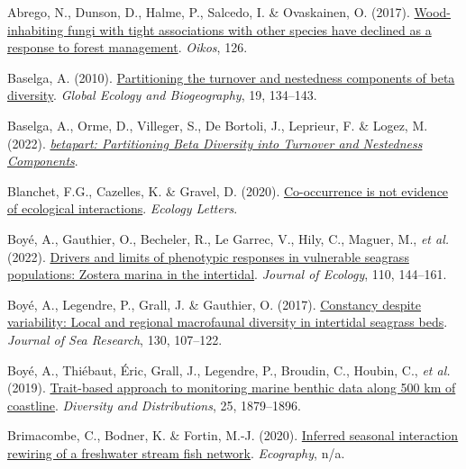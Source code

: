 \documentclass[9pt,biorxiv,doublespacing,lineno]{lapreprint}
\newlength{\cslhangindent}
\newlength{\cslentryspacingunit} %
\newenvironment{CSLReferences}[2] %
 {%
  \setlength{\parindent}{0pt}
  \ifodd #1
  \let\oldpar\par
  \def\par{\hangindent=\cslhangindent\oldpar}
  \fi
  \setlength{\parskip}{#2\cslentryspacingunit}
 }%
 {}
\begin{document}
\hypertarget{refs}{}
\begin{CSLReferences}{1}{0}
\leavevmode{}%
Abrego, N., Dunson, D., Halme, P., Salcedo, I. \& Ovaskainen, O. (2017).
\href{https://doi.org/10.1111/oik.03674}{Wood-inhabiting fungi with
tight associations with other species have declined as a response to
forest management}. \emph{Oikos}, 126.

\leavevmode{}%
Baselga, A. (2010).
\href{https://doi.org/10.1111/j.1466-8238.2009.00490.x}{Partitioning the
turnover and nestedness components of beta diversity}. \emph{Global
Ecology and Biogeography}, 19, 134--143.

\leavevmode{}%
Baselga, A., Orme, D., Villeger, S., De Bortoli, J., Leprieur, F. \&
Logez, M. (2022).
\emph{\href{https://CRAN.R-project.org/package=betapart}{betapart:
Partitioning Beta Diversity into Turnover and Nestedness Components}}.

\leavevmode{}%
Blanchet, F.G., Cazelles, K. \& Gravel, D. (2020).
\href{https://doi.org/10.1111/ele.13525}{Co-occurrence is not evidence
of ecological interactions}. \emph{Ecology Letters}.

\leavevmode{}%
Boyé, A., Gauthier, O., Becheler, R., Le Garrec, V., Hily, C., Maguer,
M., \emph{et al.} (2022).
\href{https://doi.org/10.1111/1365-2745.13791}{Drivers and limits of
phenotypic responses in vulnerable seagrass populations: Zostera marina
in the intertidal}. \emph{Journal of Ecology}, 110, 144--161.

\leavevmode{}%
Boyé, A., Legendre, P., Grall, J. \& Gauthier, O. (2017).
\href{https://doi.org/10.1016/j.seares.2017.06.004}{Constancy despite
variability: Local and regional macrofaunal diversity in intertidal
seagrass beds}. \emph{Journal of Sea Research}, 130, 107--122.

\leavevmode{}%
Boyé, A., Thiébaut, Éric, Grall, J., Legendre, P., Broudin, C., Houbin,
C., \emph{et al.} (2019).
\href{https://doi.org/10.1111/ddi.12987}{Trait-based approach to
monitoring marine benthic data along 500 km of coastline}.
\emph{Diversity and Distributions}, 25, 1879--1896.

\leavevmode{}%
Brimacombe, C., Bodner, K. \& Fortin, M.-J. (2020).
\href{https://doi.org/10.1111/ecog.05452}{Inferred seasonal interaction
rewiring of a freshwater stream fish network}. \emph{Ecography}, n/a.


\end{CSLReferences}
\end{document}
